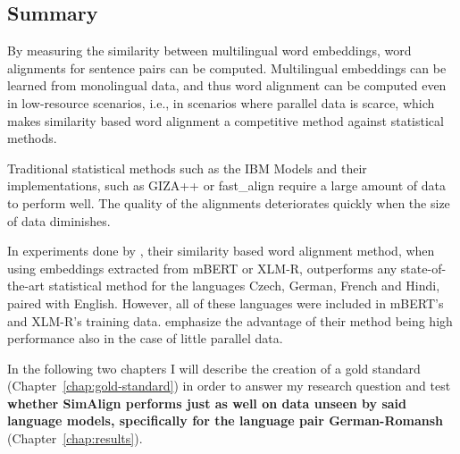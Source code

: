 \subsection{Summary}
By measuring the similarity between multilingual word embeddings, word alignments for sentence pairs can be computed. 
Multilingual embeddings can be learned from monolingual data, and thus word alignment can be computed even in low-resource scenarios, i.e., in scenarios where parallel data is scarce, which makes similarity based word alignment a competitive method against statistical methods. 

Traditional statistical methods such as the IBM Models \autocite{brown-etal-1993-mathematics} and their implementations, such as GIZA++ \autocite{och-ney-2003-smt} or fast\_align \autocite{dyer-etal-2013-simple} require a large amount of data to perform well.
The quality of the alignments deteriorates quickly when the size of data diminishes\footnotemark. 


In experiments done by \cite{jalili-sabet-etal-2020-simalign}, their similarity based word alignment method, when using embeddings extracted from mBERT or XLM-R, outperforms any state-of-the-art statistical method for the languages Czech, German, French and Hindi, paired with English. 
However, all of these languages were included in mBERT's and XLM-R's training data. 
\cite{jalili-sabet-etal-2020-simalign} emphasize the advantage of their method being high performance also in the case of little  parallel data.

In the following two chapters I will describe the creation of a gold standard (Chapter~\ref{chap:gold-standard}) in order to answer my research question and test \textbf{whether SimAlign performs just as well on data unseen by said language models, specifically for the language pair German-Romansh} (Chapter~\ref{chap:results}).



